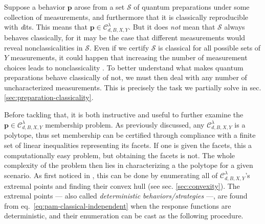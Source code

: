     Suppose a behavior $\mathbf{p}$ arose from a set $\mathcal{S}$ of quantum preparations under some collection of measurements, and furthermore that it is classically reproducible with \emph{d}its. This means that $\mathbf{p} \in \mathcal{C}_{d,B,X,Y}^\lambda$. But it does \emph{not} mean that $\mathcal{S}$ always behaves classically, for it may be the case that different measurements would reveal nonclassicalities in $\mathcal{S}$. Even if we certify $\mathcal{S}$ is classical for all possible sets of $Y$ measurements, it could happen that increasing the number of measurement choices leads to nonclassicality \cite{poderini_pamcriteria_2020}. To better understand what makes quantum preparations behave classically of not, we must then deal with any number of uncharacterized measurements. This is precisely the task we partially solve in sec. \ref{sec:preparation-classicality}. %

    Before tackling that, it is both instructive and useful to further examine the $\mathbf{p} \in \mathcal{C}_{d,B,X,Y}^\lambda$ membership problem. As previously discussed, any $\mathcal{C}_{d,B,X,Y}^\lambda$ is a polytope, thus set membership can be certified through compliance with a finite set of linear inequalities representing its facets. If one is given the facets, this a computationally easy problem, but obtaining the facets is not. The whole complexity of the problem then lies in characterizing a the polytope for a given scenario. As first noticed in \cite{gallego_pam_2010}, this can be done by enumerating all of $\mathcal{C}_{d,B,X,Y}^\lambda$'s extremal points and finding their convex hull (see sec. \ref{sec:convexity}). The extremal points --- also called \emph{deterministic behaviors/strategies} ---, are found from eq.~\eqref{eq:pam-classical-independent} when the response functions are deterministic, and their enumeration can be cast as the following procedure.

